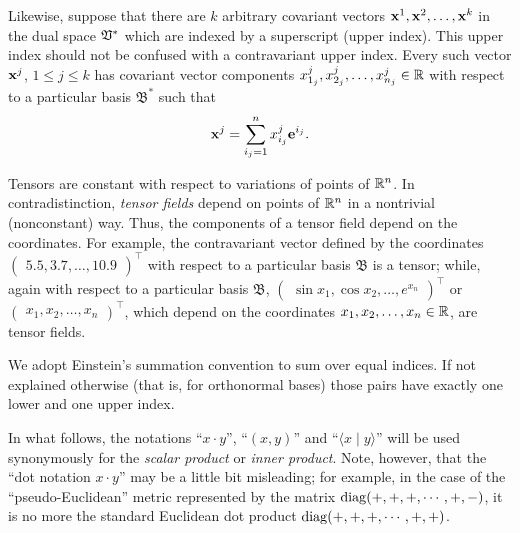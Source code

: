 Likewise, suppose that there are $k$ arbitrary covariant vectors ${\bf x}^1,{\bf x}^2,\ldots ,{\bf x}^k$ in the dual space ${\frak V}^\ast$ which are indexed by a superscript
(upper index). This upper index should not be confused with a contravariant upper index.
Every such vector ${\bf x}^j$, $1 \le j \le k$ has covariant vector components
$x_{1_j}^j, x_{2_j}^j, \ldots , x_{n_j}^j \in {\Bbb R}$
with respect to a particular basis ${\mathfrak B}^\ast$
such that
\begin{equation}
{\bf x}^j =\sum_{{i_j}=1}^n x_{i_j}^j{\bf e}^{{i_j}}.
\label{2016-m-tensor-covvs}
\end{equation}

Tensors are constant with respect to variations of points of ${\Bbb R}^n$.
In contradistinction, {\em tensor fields} depend on points of ${\Bbb R}^n$ in a nontrivial (nonconstant) way.
Thus, the components of a tensor field
depend on the coordinates.
{
\color{blue}
\bexample
For example, the contravariant vector defined by the coordinates
$
\begin{pmatrix}
5.5,
3.7,
\ldots ,
10.9
\end{pmatrix}^\intercal
$
with respect to a particular basis ${\mathfrak B}$
is a tensor; while, again with respect to a particular basis ${\mathfrak B}$,
$
\begin{pmatrix}
\sin x_1,
\cos x_2,
\ldots ,
e^{x_n}
\end{pmatrix}^\intercal
$ or
$
\begin{pmatrix}
x_1,
x_2,
\ldots ,
x_n
\end{pmatrix}^\intercal
$,
which depend on the coordinates $x_1, x_2, \ldots , x_n \in {\Bbb R}$,
are tensor fields.
\eexample
}


We adopt Einstein's summation convention to sum over equal indices.
If not explained otherwise (that is, for orthonormal bases) those pairs have exactly one lower and one upper index.


In what follows, the notations
``$x\cdot y$'',
``$(x,y)$'' and
``$\langle x\mid y\rangle $'' will be used synonymously for the {\em
scalar product}
or
{\em inner product}.
Note, however, that the ``dot notation $x\cdot y$''
may be a little bit misleading; for example, in the case of the ``pseudo-Euclidean'' metric
represented by the matrix
 ${\rm diag}(+,+,+,\cdots ,+,-)$, it is no more the standard Euclidean dot product
${\rm diag}(+,+,+,\cdots ,+,+)$.



